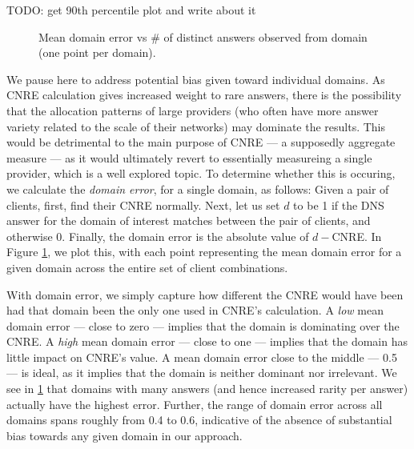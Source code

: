 TODO: get 90th percentile plot and write about it

\begin{figure}
    \caption{Mean domain error vs \# of distinct answers observed from domain
    (one point per domain).}
    \label{fig:domerr}
\end{figure}

We pause here to address potential bias given toward individual domains. As CNRE
calculation gives increased weight to rare answers, there is the possibility
that the allocation patterns of large providers (who often have more answer
variety related to the scale of their networks) may dominate the results. This
would be detrimental to the main purpose of CNRE --- a supposedly aggregate
measure --- as it would ultimately revert to essentially measureing a single
provider, which is a well explored topic. To determine whether this is occuring,
we calculate the \emph{domain error}, for a single domain, as follows: Given a
pair of clients, first, find their CNRE normally. Next, let us set $d$ to be 1
if the DNS answer for the domain of interest matches between the pair of
clients, and otherwise 0. Finally, the domain error is the absolute value of \(d
- \)CNRE. In Figure \ref{fig:domerr}, we plot this, with each
point representing the mean domain error for a given domain across
the entire set of client combinations. 

With domain error, we simply capture how different the CNRE would have
been had that domain been the only one used in CNRE's calculation. A \emph{low}
mean domain
error --- close to zero --- implies that the domain is dominating over the
CNRE. A \emph{high} mean domain error --- close to one --- implies that the domain has little impact
on CNRE's value. A mean domain error close to the middle --- 0.5 --- is ideal,
as it implies that the domain is neither dominant nor irrelevant. We see in
\ref{fig:domerr} that domains with many answers (and hence increased rarity per
answer) actually have the highest error. Further, the range of domain error
across all domains spans roughly from 0.4 to 0.6, indicative of the absence of
substantial bias towards any given domain in our approach.
